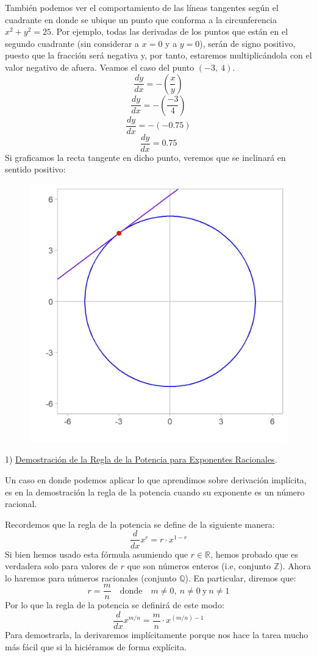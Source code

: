 \documentclass[12pt]{article}
\begin{document}
También podemos ver el comportamiento de las líneas tangentes según el cuadrante en donde se ubique un punto que conforma a la circunferencia $x^{2} + y^{2} = 25$. Por ejemplo, todas las derivadas de los puntos que están en el segundo cuadrante (sin considerar a $x = 0$ y a $y = 0$), serán de signo positivo, puesto que la fracción será negativa y, por tanto, estaremos multiplicándola con el valor negativo de afuera. Veamos el caso del punto $(-3, \ 4)$.
\[\frac{dy}{dx} = -\left(\frac{x}{y}\right)\]
\[\frac{dy}{dx} = -\left(\frac{-3}{4}\right)\]
\[\frac{dy}{dx} = -(-0.75)\]
\[\frac{dy}{dx} = 0.75\]
Si graficamos la recta tangente en dicho punto, veremos que se inclinará en sentido positivo:

\newpage

\begin{figure}[hbt!]
\centering
\includegraphics[scale=0.7]{img/implicit_diff_5.jpg}
\end{figure}

1) \underline{Demostración de la Regla de la Potencia para Exponentes Racionales}.

Un caso en donde podemos aplicar lo que aprendimos sobre derivación implícita, es en la demostración la regla de la potencia cuando su exponente es un número racional.

Recordemos que la regla de la potencia se define de la siguiente manera:
\[\frac{d}{dx} x^{r} = r \cdot x^{1-r}\]
Si bien hemos usado esta fórmula asumiendo que $r \in \mathbb{R}$, hemos probado que es verdadera solo para valores de $r$ que son números enteros (i.e, conjunto $\mathbb{Z}$). Ahora lo haremos para números racionales (conjunto $\mathbb{Q}$). En particular, diremos que:
\[r = \frac{m}{n} \quad \mathrm{donde} \quad m \neq 0, \ n \neq 0 \ \mathrm{y} \ n \neq 1\]
Por lo que la regla de la potencia se definirá de este modo:
\[\frac{d}{dx} x^{m/n} = \frac{m}{n} \cdot x^{(m/n)-1}\]
Para demostrarla, la derivaremos implícitamente porque nos hace la tarea mucho más fácil que si la hiciéramos de forma explícita.
\end{document}

